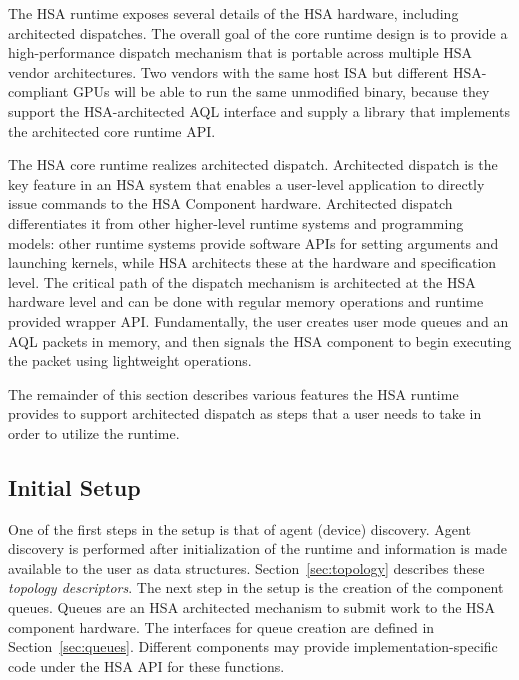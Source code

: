 \documentclass[final]{book}
\begin{document}
The HSA runtime exposes several details of the HSA hardware, including
architected dispatches. The overall goal of the core runtime design is to
provide a high-performance dispatch mechanism that is portable across multiple
HSA vendor architectures. Two vendors with the same host ISA but different
HSA-compliant GPUs will be able to run the same unmodified binary, because they
support the HSA-architected AQL interface and supply a library that implements
the architected core runtime API.

The HSA core runtime realizes architected dispatch. Architected dispatch is the
key feature in an HSA system that enables a user-level application to directly
issue commands to the HSA Component hardware. Architected dispatch
differentiates it from other higher-level runtime systems and programming
models: other runtime systems provide software APIs for setting arguments and
launching kernels, while HSA architects these at the hardware and specification
level. The critical path of the dispatch mechanism is architected at the HSA
hardware level and can be done with regular memory operations and runtime
provided wrapper API. Fundamentally, the user creates user mode queues and an
AQL packets in memory, and then signals the HSA component to begin executing the
packet using lightweight operations.

The remainder of this section describes various features the HSA runtime
provides to support architected dispatch as steps that a user needs to take in
order to utilize the runtime.

\subsection{Initial Setup}
One of the first steps in the setup is that of agent (device) discovery. Agent
discovery is performed after initialization of the runtime and information is
made available to the user as data structures. Section~\ref{sec:topology}
describes these \textit{topology descriptors}. The next step in the setup is the
creation of the component queues. Queues are an HSA architected mechanism to
submit work to the HSA component hardware. The interfaces for queue creation are
defined in Section~\ref{sec:queues}. Different components may provide
implementation-specific code under the HSA API for these functions.

\end{document}
